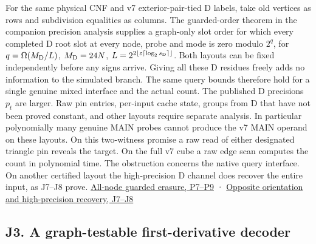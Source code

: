 \documentclass[11pt,a4paper]{article}
\begin{document}
For the same physical CNF and v7 exterior-pair-tied D labels, take old
vertices as rows and subdivision equalities as columns. The
guarded-order theorem in the companion precision analysis supplies a
graph-only slot order for which every completed D root slot at every
node, probe and mode is zero modulo \(2^q\), for
\(q=\Omega(M_{\rm D}/L)\), \(M_{\rm D}=24N\),
\(L=2^{2\lfloor\varepsilon\lceil\log_2 s_{\rm D}\rceil\rfloor}\). Both
layouts can be fixed independently before any signs arrive. Giving all
these D residues freely adds no information to the simulated branch. The
same query bounds therefore hold for a single genuine mixed interface
and the actual count. The published D precisions \(p_t\) are larger. Raw
pin entries, per-input cache state, groups from D that have not been
proved constant, and other layouts require separate analysis. In
particular polynomially many genuine MAIN probes cannot produce the v7
MAIN operand on these layouts. On this two-witness promise a raw read of
either designated triangle pin reveals the target. On the full v7 cube a
raw edge scan computes the count in polynomial time. The obstruction
concerns the native query interface. On another certified layout the
high-precision D channel does recover the entire input, as J7--J8 prove.
\hyperref[v9-section-precision-frontier]{All-node guarded erasure, P7--P9}
· \hyperref[v9-section-moment-escape]{Opposite orientation and
high-precision recovery, J7--J8}

\subsection{J3. A graph-testable first-derivative
decoder}\label{v9-j3-a-graph-testable-first-derivative-decoder}
\end{document}
